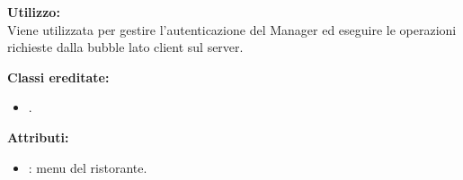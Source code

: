 \textbf{Utilizzo:}\\
Viene utilizzata per gestire l'autenticazione del Manager ed eseguire le operazioni richieste dalla bubble lato client sul server.

\textbf{Classi ereditate:}
\begin{itemize}
	\item {}.
\end{itemize}
%

\textbf{Attributi:}
\begin{itemize}
	\item {}: menu del ristorante.
\end{itemize}

